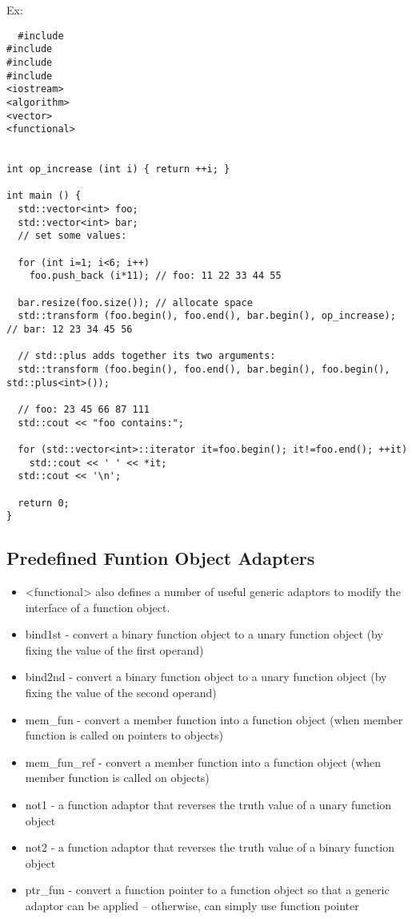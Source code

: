 \documentclass[12pt]{article}
\begin{document}
Ex:
\begin{lstlisting}
  #include
#include
#include
#include
<iostream>
<algorithm>
<vector>
<functional>


int op_increase (int i) { return ++i; }

int main () {
  std::vector<int> foo;
  std::vector<int> bar;
  // set some values:

  for (int i=1; i<6; i++)
    foo.push_back (i*11); // foo: 11 22 33 44 55

  bar.resize(foo.size()); // allocate space
  std::transform (foo.begin(), foo.end(), bar.begin(), op_increase); // bar: 12 23 34 45 56

  // std::plus adds together its two arguments:
  std::transform (foo.begin(), foo.end(), bar.begin(), foo.begin(), std::plus<int>());

  // foo: 23 45 66 87 111
  std::cout << "foo contains:";

  for (std::vector<int>::iterator it=foo.begin(); it!=foo.end(); ++it)
    std::cout << ' ' << *it;
  std::cout << '\n';

  return 0;
}
\end{lstlisting}

\subsection*{Predefined Funtion Object Adapters}
\begin{itemize}
\item <functional> also defines a number of useful generic adaptors to modify the interface of a function object.
\item bind1st - convert a binary function object to a unary function object (by fixing the value of the first operand)
\item bind2nd - convert a binary function object to a unary function object (by fixing the value of the second operand)
\item mem_fun - convert a member function into a function object (when member function is called on pointers to objects)
\item mem_fun_ref - convert a member function into a function object (when member function is called on objects)
\item not1 - a function adaptor that reverses the truth value of a unary function object
\item not2 - a function adaptor that reverses the truth value of a binary function object
\item ptr_fun - convert a function pointer to a function object so that a generic adaptor can be applied -- otherwise, can simply use function pointer
\end{itemize}
\end{document}
